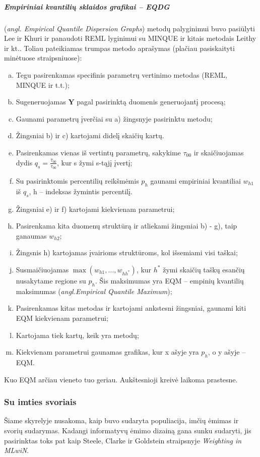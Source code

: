 \documentclass[12pt,a4paper]{article}
\begin{document}
\subparagraph{Empiriniai kvantilių sklaidos grafikai -- EQDG}(\textit{angl. Empirical Quantile Dispersion Graphs}) metodų palyginimui buvo pasiūlyti Lee ir Khuri\cite{eqdg1} ir panaudoti REML lyginimui su MINQUE ir kitais metodais Leithy ir kt.\cite{MMINQUE}. Toliau pateikiamas trumpas metodo aprašymas (plačiau pasiskaityti minėtuose straipsniuose):
\begin{enumerate}[a)] 
\item Tegu pasirenkamas specifinis parametrų vertinimo metodas (REML, MINQUE ir t.t.);
\item Sugeneruojamas $\mathbf{Y}$ pagal pasirinktą duomenis generuojantį procesą;
\item Gaunami parametrų įverčiai su a) žingsnyje pasirinktu metodu;
\item Žingsniai b) ir c) kartojami didelį skaičių kartų.
\item Pasirenkamas vienas iš vertintų parametrų, sakykime $\tau_{00}$ ir skaičiuojamas dydis $q_s=\frac{\hat{\tau}_{00}}{\tau_{00}}$, kur s žymi s-tąjį įvertį;
\item Su pasirinktomis percentilių reikšmėmis $p_h$ gaunami empiriniai kvantiliai $w_{h1}$ iš $q_s$, h -- indeksas žymintis percentilį.
\item Žingsniai e) ir f) kartojami kiekvienam parametrui;
\item Pasirenkama kita duomenų struktūrą ir atliekami žingsniai b) - g), taip ganaumas $w_{h2}$;
\item Žingsnis h) kartojamas įvairioms struktūroms, kol išsemiami visi taškai;
\item Susmaičiuojamas $\max (w_{h1},\dots,w_{hh^*})$, kur $h^*$ žymi skaičių taškų esančių nusakytame regione su $p_h$. Šis maksimumas yra EQM -- empinių kvantilių maksimumas (\textit{angl.Empirical Quantile Maximum});
\item Pasirenkamas kitas metodas ir kartojami ankstesni žingsniai, gaunami kiti EQM kiekvienam parametrui;
\item Kartojama tiek kartų, keik yra metodų;
\item Kiekvienam parametrui gaunamas grafikas, kur x ašyje yra $p_h$, o y ašyje -- EQM.
\end{enumerate}
\indent Kuo EQM arčiau vieneto tuo geriau. Aukštesnioji kreivė laikoma prastesne.

\subsubsection{Su imties svoriais}\label{subsubsec:susvoriais}
\indent Šiame skyrelyje nusakoma, kaip buvo sudaryta populiacija, imčių ėmimas ir svorių sudarymas. Kadangi informatyvų ėmimo dizainą gana sunku sudaryti, jis pasirinktas toks pat kaip Steele, Clarke ir Goldstein straipsnyje \textit{Weighting in MLwiN}\cite{mlwin}. 
\end{document}
